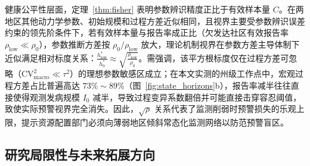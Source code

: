 \documentclass[11pt,a4paper]{article}
\theoremstyle{plain}
\theoremstyle{definition}
\begin{document}
健康公平性层面，定理~\ref{thm:fisher} 表明参数辨识精度正比于有效样本量 $C$。在两地区其他动力学参数、初始规模和过程方差近似相同，且视界主要受参数辨识误差约束的领先阶条件下，若有效样本量与报告率成正比（欠发达社区有效报告率 $\rho_{\text{low}} \ll \rho_0$），参数推断方差按 $\rho_0/\rho_{\text{low}}$ 放大，理论机制视界在参数方差主导体制下近似满足相对标度关系：$\frac{h^*_{\text{low}}}{h^*_0} \approx \sqrt{\frac{\rho_{\text{low}}}{\rho_0}}$。需强调，该平方根标度仅在过程方差可忽略（$\text{CV}^2_{\text{macro}} \ll \tau^2$）的理想参数敏感区成立；在本文实测的州级工作点中，宏观过程方差占比普遍高达 $73\%\sim 89\%$（图~\ref{fig:state_horizons}b），报告率减半往往直接使得观测发病规模 $I_0$ 减半，导致过程变异系数翻倍并可能直接击穿容忍阈值，致使实际预警视界完全消失。因此，$\sqrt{\rho}$ 关系代表了监测削弱时预警损失的乐观上限，提示资源配置部门必须向薄弱地区倾斜常态化监测网络以防范预警盲区。

\subsection{研究局限性与未来拓展方向}\label{sec:limitations}
\end{document}
